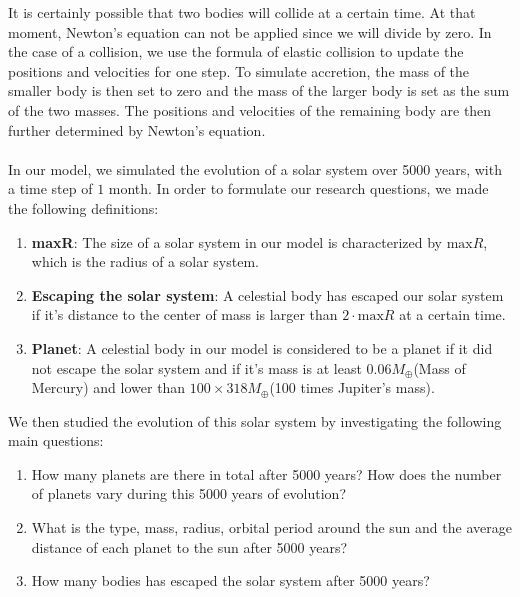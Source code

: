 It is certainly possible that two bodies will collide at a certain time. At that moment, Newton's equation can not be applied since we will divide by zero. In the case of a collision, we use the formula of elastic collision to update the positions and velocities for one step. 
To simulate accretion, the mass of the smaller body is then set to zero and the mass of the larger body is set as the sum of the two masses. The positions and velocities of the remaining body are then further determined by Newton's equation.\\
\\
In our model, we simulated the evolution of a solar system over 5000 years, with a time step of $1$ month. In order to formulate our research questions, we made the following definitions:\\
\begin{enumerate}
\item \textbf{maxR}: The size of a solar system in our model is characterized by $\text{max}R$, which is the radius of a solar system. 
\item \textbf{Escaping the solar system}: A celestial body has escaped our solar system if it's distance to the center of mass is larger than $2\cdot\text{max}R$ at a certain time.
\item \textbf{Planet}: A celestial body in our model is considered to be a planet if it did not escape the solar system and if it's mass is at least  0.06$M_{\oplus}$(Mass of Mercury) and lower than $100\times 318M_{\oplus}$(100 times Jupiter's mass).
\end{enumerate}
We then studied the evolution of this solar system by investigating the following main questions:
\begin{enumerate}
	\item  How many planets are there in total after 5000 years? How does the number of planets vary during this 5000 years of evolution?

	\item What is the type, mass, radius, orbital period around the sun and the average distance of each planet to the sun after 5000 years?


	\item How many bodies has escaped the solar system after 5000 years?

\end{enumerate}
 